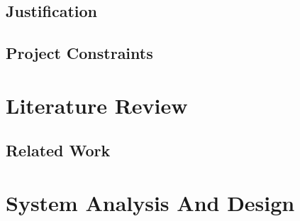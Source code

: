 \documentclass{report}
\begin{document}
\subsection{Justification}




\subsection{Project Constraints}



\section{Literature Review}

\subsection{Related Work}

\section{System Analysis And Design}








\end{document}
